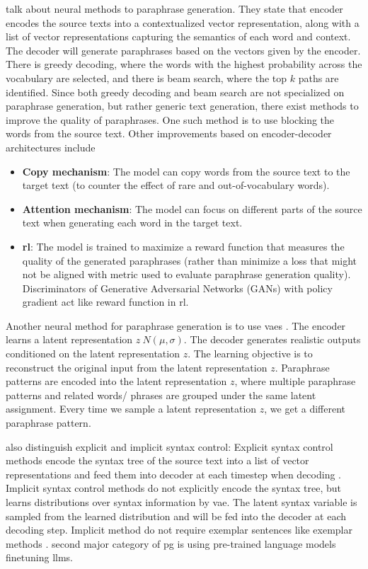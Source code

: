 \citet{zhou_paraphrase_2021} talk about neural methods to paraphrase generation.
They state that encoder encodes the source texts into a contextualized vector representation, 
along with a list of vector representations capturing the semantics of each word and context.
The decoder will generate paraphrases based on the vectors given by the encoder.
There is greedy decoding, where the words with the highest probability across the vocabulary are selected, 
and there is beam search, where the top $k$ paths are identified.
Since both greedy decoding and beam search are not specialized on paraphrase generation, but rather generic text generation, 
there exist methods to improve the quality of paraphrases.
One such method is to use blocking the words from the source text.
Other improvements based on encoder-decoder architectures include
\begin{itemize}
    \item \textbf{Copy mechanism}: The model can copy words from the source text to the target text (to counter the effect of rare and out-of-vocabulary words).
    \item \textbf{Attention mechanism}: The model can focus on different parts of the source text when generating each word in the target text.
    \item \textbf{\ac{rl}}: The model is trained to maximize a reward function that measures the quality of the generated paraphrases 
    (rather than minimize a loss that might not be aligned with metric used to evaluate paraphrase generation quality). 
    Discriminators of Generative Adversarial Networks (GANs) with policy gradient act like reward function in \ac{rl}.
\end{itemize}

Another neural method for paraphrase generation is to use \acp{vae} \citep{zhou_paraphrase_2021}.
The encoder learns a latent representation $z ~ N(\mu, \sigma)$.
The decoder generates realistic outputs conditioned on the latent representation $z$.
The learning objective is to reconstruct the original input from the latent representation $z$.
Paraphrase patterns are encoded into the latent representation $z$, where multiple paraphrase 
patterns and related words/ phrases are grouped under the same latent assignment.
Every time we sample a latent representation $z$, we get a different paraphrase pattern.

\citet{zhou_paraphrase_2021} also distinguish explicit and implicit syntax control:
Explicit syntax control methods encode the syntax tree of the source text into a list of vector representations 
and feed them into decoder at each timestep when decoding \citep{zhou_paraphrase_2021,palivela_optimization_2021}.
Implicit syntax control methods do not explicitly encode the syntax tree, 
but learns distributions over syntax information by \ac{vae}. 
The latent syntax variable is sampled from the learned distribution and will be fed into the decoder at each decoding step.
Implicit method do not require exemplar sentences like exemplar methods \citep{zhou_paraphrase_2021}.
\citet{palivela_optimization_2021} second major category of \ac{pg} is using pre-trained language models finetuning \acp{llm}.

